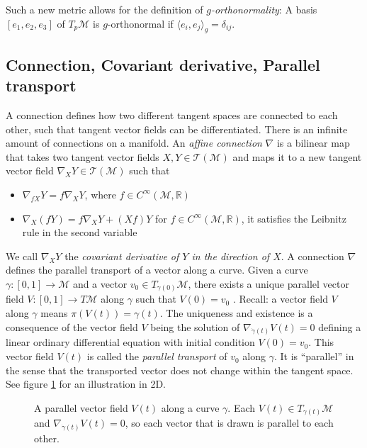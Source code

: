 \documentclass[../thesis.tex]{subfiles}
\begin{document}
Such a new metric allows for the definition of \emph{$g$-orthonormality}:
A basis $[e_1, e_2, e_3]$ of $T_p\mathcal{M}$ is $g$-orthonormal if $\langle e_i, e_j \rangle_g = \delta_{ij}$.

\subsection{Connection, Covariant derivative, Parallel transport}
A connection defines how two different tangent spaces are connected to each other, such that tangent vector fields
can be differentiated. There is an infinite amount of connections on a manifold.
An \emph{affine connection} $\nabla$ is a bilinear map that takes two tangent vector fields $X,Y \in \mathcal{T}(\mathcal{M})$ and maps it
to a new tangent vector field $\nabla_XY \in \mathcal{T}(\mathcal{M})$ such that
\begin{itemize}
  \item $\nabla_{fX}Y = f \nabla_XY$, where $f\in C^{\infty}(\mathcal{M}, \mathbb{R})$
  \item $\nabla_X(fY) = f\nabla_XY + (Xf)Y$ for $f\in C^{\infty}(\mathcal{M}, \mathbb{R})$, it satisfies the Leibnitz rule in the second variable
\end{itemize}
We call $\nabla_XY$ the \emph{covariant derivative of $Y$ in the direction of $X$}.
A connection $\nabla$ defines the parallel transport
of a vector along a curve. Given a curve $\gamma: [0,1] \to \mathcal{M}$ and
a vector $v_0 \in T_{\gamma(0)}\mathcal{M}$, there exists a unique parallel vector field $V: [0,1] \to T\mathcal{M}$ along $\gamma$
such that $V(0) = v_0$ \cite{LeeCurvature}.
Recall: a vector field $V$ along $\gamma$ means $\pi(V(t))=\gamma(t)$.
The uniqueness and existence is a consequence of the vector field $V$ being the solution
of $\nabla_{\dot{\gamma}(t)}V(t) = 0$ defining a linear ordinary differential equation with initial condition
$V(0)=v_0$. This vector field $V(t)$ is called the \emph{parallel transport} of $v_0$ along $\gamma$.
It is ``parallel'' in the sense that the transported vector does not change within the tangent space.
See figure \ref{fig:vectorfield} for an illustration in 2D.
\begin{figure}[htb]
  \centering
  \def\svgwidth{20em}
  
  \caption{A parallel vector field $V(t)$ along a curve $\gamma$. Each $V(t)\in T_{\gamma(t)}\mathcal{M}$ and
  $\nabla_{\dot{\gamma}(t)}V(t) = 0$, so each vector that is drawn is parallel to each other.}
  \label{fig:vectorfield}
\end{figure}
\end{document}
